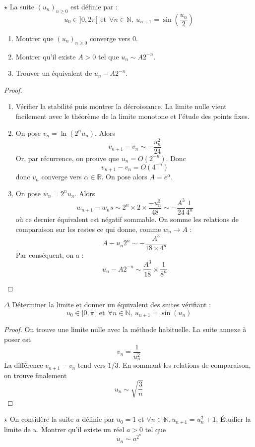 \documentclass[french,a4paper]{article}
\newcommand{\N}{\mathbb{N}}
\newcommand{\R}{\mathbb{R}}
\theoremstyle{plain}
\theoremstyle{definition}
\theoremstyle{remark}
\begin{document}
\begin{ex}[Moulin.55]{$\star$}
	La suite $(u_n)_{n\geqslant0}$ est définie par : $$u_0\in]0,2\pi[\ \ \text{et} \ \ \forall n\in\N,\ u_{n+1}=\sin\left(\frac{u_n}{2}\right)$$
	\begin{enumerate}
		\item Montrer que $(u_n)_{n\geqslant0}$ converge vers $0$.
		\item Montrer qu'il existe $A>0$ tel que $u_n\sim A2^{-n}$.
		\item Trouver un équivalent de $u_n-A2^{-n}$.
	\end{enumerate}
\end{ex}

\begin{proof}
	\begin{enumerate}
		\item Vérifier la stabilité puis montrer la décroissance. La limite nulle vient facilement avec le théorème de la limite monotone et l'étude des points fixes.
		\item On pose $v_n=\ln(2^nu_n)$. Alors $$v_{n+1}-v_n\sim-\frac{u_n^2}{24}$$ Or, par récurrence, on prouve que $u_n=O(2^{-n})$. Donc $$v_{n+1}-v_n=O(4^{-n})$$ donc $v_n$ converge vers $\alpha\in\R$. On pose alors $A=e^{\alpha}$.
		\item On pose $w_n=2^nu_n$. Alors $$w_{n+1}-w_ns\sim 2^n\times 2\times\frac{-u_n^3}{48}\sim-\frac{A^3}{24}\frac{1}{4^n}$$ où ce dernier équivalent est négatif sommable. On somme les relations de comparaison sur les restes ce qui donne, comme $w_n\to A$ : $$A-u_n2^n\sim-\frac{A^3}{18\times 4^n}$$ Par conséquent, on a : $$u_n-A2^{-n}\sim\frac{A^3}{18}\times\frac{1}{8^n}$$
	\end{enumerate}
\end{proof}

\begin{ex}[Moulin.56]{$\Delta$}
	Déterminer la limite et donner un équivalent des suites vérifiant : $$u_{0}\in]0,\pi[ \ \ \text{et} \ \ \forall n\in\N,\ u_{n+1}=\sin(u_n)$$
\end{ex}

\begin{proof}
	On trouve une limite nulle avec la méthode habituelle. La suite annexe à poser est $$v_n=\frac{1}{u_n^2}$$ La différence $v_{n+1}-v_n$ tend vers $1/3$. En sommant les relations de comparaison, on trouve finalement $$u_n\sim\sqrt{\frac{3}{n}}$$
\end{proof}

\begin{ex}[Moulin.57]{$\star$}
	On considère la suite $u$ définie par $u_0=1$ et $\forall n\in\N, u_{n+1}=u_n^2+1$. Étudier la limite de $u$. Montrer qu'il existe un réel $a>0$ tel que $$u_n\sim a^{2^n}$$
\end{ex}
\end{document}
